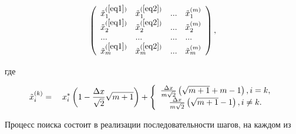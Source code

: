 \documentclass [12pt]{article}
\begin{document}
\[

\left( {{\begin{array}{*{20}c}

 {\tilde {x}_1^{(\ref{eq1})} } \hfill & {\tilde {x}_1^{(\ref{eq2})} } \hfill & {...} \hfill 

& {\tilde {x}_1^{(m)} } \hfill \\

 {\tilde {x}_2^{(\ref{eq1})} } \hfill & {\tilde {x}_2^{(\ref{eq2})} } \hfill & {...} \hfill 

& {\tilde {x}_2^{(m)} } \hfill \\

 {...} \hfill & {...} \hfill & {...} \hfill & {...} \hfill \\

 {\tilde {x}_m^{(\ref{eq1})} } \hfill & {\tilde {x}_m^{(\ref{eq2})} } \hfill & {...} \hfill 

& {\tilde {x}_m^{(m)} } \hfill \\

\end{array} }} \right),

\]







\noindent

где





\[

\tilde {x}_i^{(k)} = 

\quad

x_i^\ast \left( {1 - \frac{\Delta x}{\sqrt 2 }\sqrt {m + 1} } \right) + 

\left\{ {{\begin{array}{*{20}c}

 {\frac{\Delta x}{m\sqrt 2 }\left( {\sqrt {m + 1} + m - 1} \right),i = k,} 

\\

 {\frac{\Delta x}{m\sqrt 2 }\left( {\sqrt {m + 1} - 1} \right),i \ne k.} \\

\end{array} }} \right.

\]







Процесс поиска состоит в реализации последовательности шагов, на каждом из 
\end{document}
